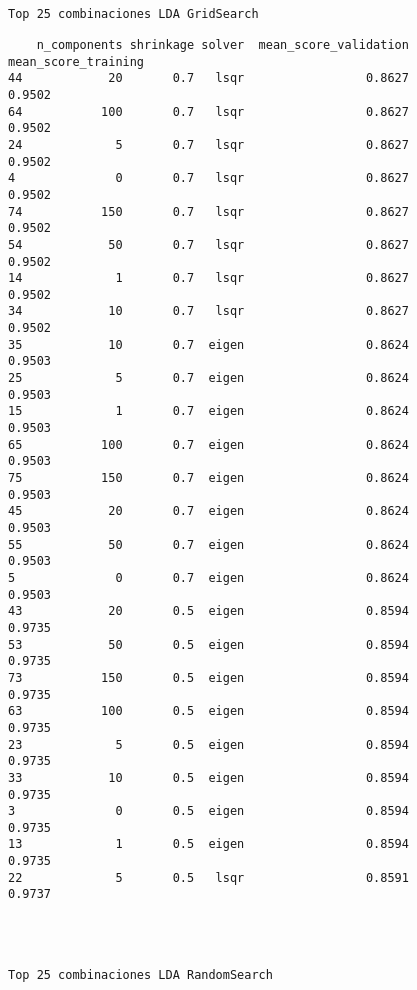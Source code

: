 \documentclass[11pt]{article}
\begin{document}
    \begin{Verbatim}[commandchars=\\\{\}]
 
 
Top 25 combinaciones LDA GridSearch

    \end{Verbatim}

    
    \begin{verbatim}
    n_components shrinkage solver  mean_score_validation  mean_score_training
44            20       0.7   lsqr                 0.8627               0.9502
64           100       0.7   lsqr                 0.8627               0.9502
24             5       0.7   lsqr                 0.8627               0.9502
4              0       0.7   lsqr                 0.8627               0.9502
74           150       0.7   lsqr                 0.8627               0.9502
54            50       0.7   lsqr                 0.8627               0.9502
14             1       0.7   lsqr                 0.8627               0.9502
34            10       0.7   lsqr                 0.8627               0.9502
35            10       0.7  eigen                 0.8624               0.9503
25             5       0.7  eigen                 0.8624               0.9503
15             1       0.7  eigen                 0.8624               0.9503
65           100       0.7  eigen                 0.8624               0.9503
75           150       0.7  eigen                 0.8624               0.9503
45            20       0.7  eigen                 0.8624               0.9503
55            50       0.7  eigen                 0.8624               0.9503
5              0       0.7  eigen                 0.8624               0.9503
43            20       0.5  eigen                 0.8594               0.9735
53            50       0.5  eigen                 0.8594               0.9735
73           150       0.5  eigen                 0.8594               0.9735
63           100       0.5  eigen                 0.8594               0.9735
23             5       0.5  eigen                 0.8594               0.9735
33            10       0.5  eigen                 0.8594               0.9735
3              0       0.5  eigen                 0.8594               0.9735
13             1       0.5  eigen                 0.8594               0.9735
22             5       0.5   lsqr                 0.8591               0.9737
    \end{verbatim}

    
    \begin{Verbatim}[commandchars=\\\{\}]
 
 
 
Top 25 combinaciones LDA RandomSearch

    \end{Verbatim}
\end{document}
